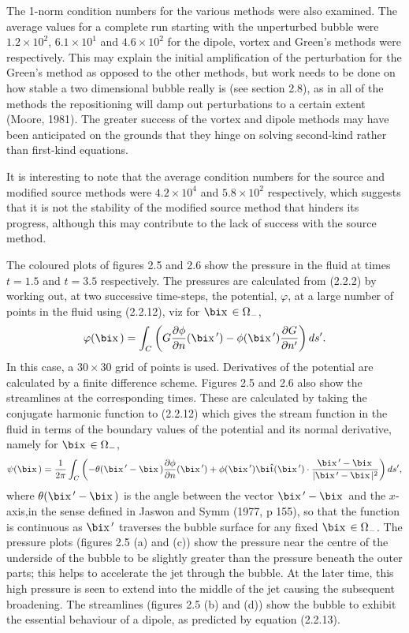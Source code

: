 The 1-norm condition numbers for the various methods were also examined.
The average values for a complete run starting with the unperturbed 
bubble were
$1.2\times 10^2$, $6.1\times 10^1$ and $4.6\times 10^2$
for the dipole, vortex and Green's methods were respectively.
This may explain the
initial amplification of the perturbation for the Green's method as
opposed to the other methods, but work needs to be done on how stable
a two dimensional bubble really is
(see section 2.8), as in all of the methods
the repositioning will damp out perturbations to a certain extent
(Moore, 1981).
The greater success of the vortex and dipole methods may have been
anticipated on the grounds that they hinge on solving second-kind
rather  than  first-kind  equations.

It is interesting to note that the average condition numbers for the
source and modified source methods were $4.2\times 10^4$ and $5.8\times 10^2$
respectively, which suggests that it is not the stability of the
modified source method that hinders its progress, although this 
may contribute to the lack of success with the source method. 

The coloured plots of figures 2.5 and 2.6 show the pressure in 
the fluid at times $t=1.5$ and $t = 3.5$ respectively.
The pressures are calculated from (2.2.2) by working out,
at two successive time-steps, the potential, $\varphi$, at
a large number of points in the fluid using (2.2.12),
viz for $\bd{x}\in \Omega_-$,
$$\varphi(\bd{x})=\int_C
\left(G{\partial\phi\over\partial n}(\bd{x}')-
\phi(\bd{x}'){\partial G\over\partial n'}\right)ds'.$$
In  this  case,  a 
$30\times 30$ grid of  points is used.
Derivatives of the potential are calculated
by a finite difference scheme.
Figures 2.5 and 2.6 
also show the streamlines at the corresponding times. These
are calculated by taking the conjugate harmonic function to 
(2.2.12) which gives the stream function in the fluid in 
terms of the boundary values of the potential and its normal 
derivative, namely for $\bd{x}\in \Omega_-$,
$$\psi(\bd{x})={1\over 2\pi}\int_C\left(-\theta(\bd{x}'-
\bd{x}){\partial\phi\over\partial n}(\bd{x}')+
\phi(\bd{x}')\bh{t}(\bd{x}')\cdot
{\bd{x}'-\bd{x}\over|\bd{x}'-\bd{x}|^2}
\right)ds',$$
where $\theta(\bd{x}'-\bd{x})$ is the angle between 
the vector $\bd{x}'-\bd{x}$ and the $x$-axis,in the 
sense defined in Jaswon and Symm (1977, p 155), so that 
the function is continuous as $\bd{x}'$ traverses the bubble
surface for any fixed $\bd{x}\in\Omega_-$.
The pressure plots (figures 2.5 (a) and (c))
show the pressure near the centre of the underside
of the bubble to be slightly greater  than  the pressure beneath 
the outer parts; this helps to accelerate the jet through the 
bubble. 
At the later time, this high pressure is seen to extend into the 
middle of the jet causing the subsequent broadening.
The streamlines (figures 2.5 (b) and (d)) 
show the bubble to exhibit the essential behaviour
of a dipole, as predicted by equation (2.2.13).

